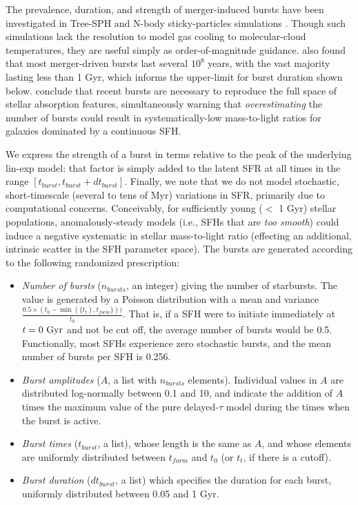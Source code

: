 The prevalence, duration, and strength of merger-induced bursts have been investigated in Tree-SPH and N-body sticky-particles simulations \citep{dimatteo_08}. Though such simulations lack the resolution to model gas cooling to molecular-cloud temperatures, they are useful simply as order-of-magnitude guidance. \citet{dimatteo_08} also found that most merger-driven bursts last several $10^8$ years, with the vast majority lasting less than 1 Gyr, which informs the upper-limit for burst duration shown below. \citet{gallazzi_bell_09} conclude that recent bursts are necessary to reproduce the full space of stellar absorption features, simultaneously warning that \textit{overestimating} the number of bursts could result in systematically-low mass-to-light ratios for galaxies dominated by a continuous SFH.

We express the strength of a burst in terms relative to the peak of the underlying lin-exp model: that factor is simply added to the latent SFR at all times in the range $[t_{burst}, t_{burst} + dt_{burst}]$. Finally, we note that we do not model stochastic, short-timescale (several to tens of Myr) variations in SFR, primarily due to computational concerns. Conceivably, for sufficiently young ($<$ 1 Gyr) stellar populations, anomalously-steady models (i.e., SFHs that are \emph{too smooth}) could induce a negative systematic in stellar mass-to-light ratio (effecting an additional, intrinsic scatter in the SFH parameter space). The bursts are generated according to the following randomized prescription:

\begin{itemize}
    \item \emph{Number of bursts} ($n_{bursts}$, an integer) giving the number of starbursts. The value is generated by a Poisson distribution with a mean and variance $\frac{0.5 \times (t_0 - \min(\{t_{t}), t_{form}\}))}{t_0}$. That is, if a SFH were to initiate immediately at $t=0~{\rm Gyr}$ and not be cut off, the average number of bursts would be 0.5. Functionally, most SFHs experience zero stochastic bursts, and the mean number of bursts per SFH is 0.256.
    \item \emph{Burst amplitudes} ($A$, a list with $n_{bursts}$ elements). Individual values in $A$ are distributed log-normally between 0.1 and 10, and indicate the addition of $A$ times the maximum value of the pure delayed-$\tau$ model during the times when the burst is active.
    \item \emph{Burst times} ($t_{burst}$, a list), whose length is the same as $A$, and whose elements are uniformly distributed between $t_{form}$ and $t_0$ (or $t_{t}$, if there is a cutoff).
    \item \emph{Burst duration} ($dt_{burst}$, a list) which specifies the duration for each burst, uniformly distributed between 0.05 and 1 Gyr. 
\end{itemize}

